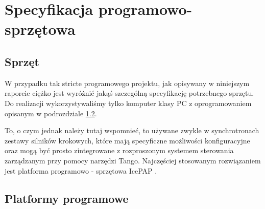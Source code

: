 \clearpage
\section{Specyfikacja programowo-sprzętowa}
\label{sec:spec_prog}

\subsection{Sprzęt}
\quad W przypadku tak stricte programowego projektu, jak opisywany w niniejszym raporcie ciężko jest wyróżnić jakąś szczególną specyfikację potrzebnego sprzętu. Do realizacji wykorzystywaliśmy tylko komputer klasy PC z oprogramowaniem opisanym w podrozdziale \ref{sub:plat_prog}.

To, o czym jednak należy tutaj wspomnieć, to używane zwykle w synchrotronach zestawy silników krokowych, które mają specyficzne możliwości konfiguracyjne oraz mogą być prosto zintegrowane z rozproszonym systemem sterowania zarządzanym przy pomocy narzędzi Tango. Najczęściej stosowanym rozwiązaniem jest platforma programowo - sprzętowa IcePAP \cite{web:icepap, proc:icepap}.

\subsection{Platformy programowe}
\label{sub:plat_prog}

